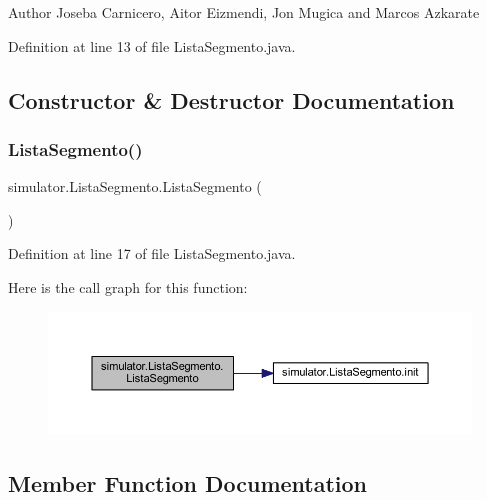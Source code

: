 \begin{DoxyAuthor}{Author}
Joseba Carnicero, Aitor Eizmendi, Jon Mugica and Marcos Azkarate 
\end{DoxyAuthor}


Definition at line 13 of file Lista\+Segmento.\+java.



\subsection{Constructor \& Destructor Documentation}
\mbox{\label{classsimulator_1_1_lista_segmento_af57e1ba52661c323d60e8a9f41f1042c}} 
\subsubsection{\texorpdfstring{Lista\+Segmento()}{ListaSegmento()}}
{\footnotesize\ttfamily simulator.\+Lista\+Segmento.\+Lista\+Segmento (\begin{DoxyParamCaption}{ }\end{DoxyParamCaption})}



Definition at line 17 of file Lista\+Segmento.\+java.

Here is the call graph for this function\+:\nopagebreak
\begin{figure}[H]
\begin{center}
\leavevmode
\includegraphics[width=350pt]{classsimulator_1_1_lista_segmento_af57e1ba52661c323d60e8a9f41f1042c_cgraph}
\end{center}
\end{figure}


\subsection{Member Function Documentation}
\mbox{\label{classsimulator_1_1_lista_segmento_ab699a3169c41d7baac0f86e47c0df66e}} 
